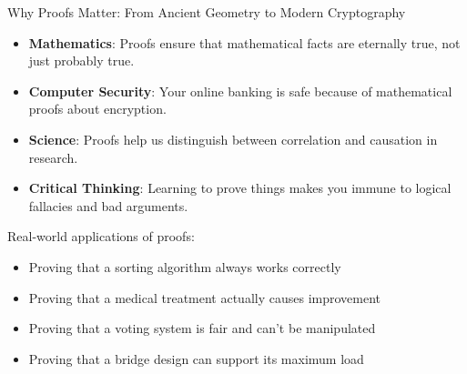 \documentclass{beamer}
\begin{document}
	\begin{frame}{Why Proofs Matter: From Ancient Geometry to Modern Cryptography}
		\begin{itemize}
			\item \textbf{Mathematics}: Proofs ensure that mathematical facts are eternally true, not just probably true.
			\item \textbf{Computer Security}: Your online banking is safe because of mathematical proofs about encryption.
			\item \textbf{Science}: Proofs help us distinguish between correlation and causation in research.
			\item \textbf{Critical Thinking}: Learning to prove things makes you immune to logical fallacies and bad arguments.
		\end{itemize}
		
		\begin{example}
			Real-world applications of proofs:
			\begin{itemize}
				\scriptsize
				\item Proving that a sorting algorithm always works correctly
				\item Proving that a medical treatment actually causes improvement
				\item Proving that a voting system is fair and can't be manipulated
				\item Proving that a bridge design can support its maximum load
			\end{itemize}
		\end{example}
	\end{frame}
	
\end{document}
